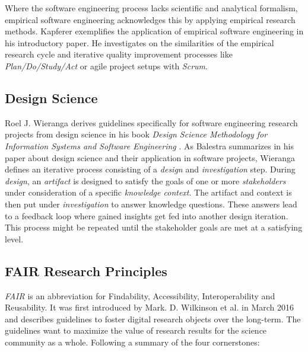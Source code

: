 \documentclass[12pt,a4paper]{article}
\begin{document}
Where the software engineering process lacks scientific and analytical formalism, empirical software engineering acknowledges this by applying empirical research methods. Kapferer \cite{kapferer:2019:empirical} exemplifies the application of empirical software engineering in his introductory paper. He investigates on the similarities of the empirical research cycle and iterative quality improvement processes like \emph{Plan/Do/Study/Act} \cite{deming} or agile project setups with \emph{Scrum}.

\subsection{Design Science}

Roel J. Wieranga derives guidelines specifically for software engineering research projects from design science in his book \emph{Design Science Methodology for Information Systems and Software Engineering} \cite{wieringa}. As Balestra \cite{balestra:2019:designscience:articactandcontext} summarizes in his paper about design science and their application in software projects, Wieranga \cite{wieringa} defines an iterative process consisting of a \emph{design} and \emph{investigation} step. During \emph{design}, an \emph{artifact} is designed to satisfy the goals of one or more \emph{stakeholders} under consideration of a specific \emph{knowledge context}. The artifact and context is then put under \emph{investigation} to answer knowledge questions. These answers lead to a feedback loop where gained insights get fed into another design iteration. This process might be repeated until the stakeholder goals are met at a satisfying level.

\subsection{FAIR Research Principles}
\label{sec:fair}

\emph{FAIR} is an abbreviation for Findability, Accessibility, Interoperability and Reusability. It was first introduced by Mark. D. Wilkinson et al. in March 2016 \cite{wilkinson:2016} and describes guidelines to foster digital research objects over the long-term. The guidelines want to maximize the value of research results for the science community as a whole. Following a summary of the four cornerstones:
\end{document}
